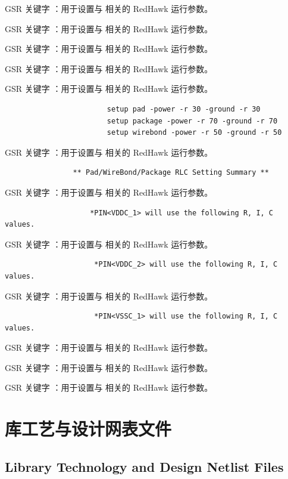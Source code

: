 GSR 关键字 ：用于设置与  相关的 RedHawk 运行参数。

GSR 关键字 ：用于设置与  相关的 RedHawk 运行参数。

GSR 关键字 ：用于设置与  相关的 RedHawk 运行参数。

GSR 关键字 ：用于设置与  相关的 RedHawk 运行参数。

GSR 关键字 ：用于设置与  相关的 RedHawk 运行参数。

\begin{lstlisting}
                        setup pad -power -r 30 -ground -r 30
                        setup package -power -r 70 -ground -r 70
                        setup wirebond -power -r 50 -ground -r 50
\end{lstlisting}

GSR 关键字 ：用于设置与  相关的 RedHawk 运行参数。

\begin{lstlisting}
                ** Pad/WireBond/Package RLC Setting Summary **
\end{lstlisting}

GSR 关键字 ：用于设置与  相关的 RedHawk 运行参数。

\begin{lstlisting}
                    *PIN<VDDC_1> will use the following R, I, C values.
\end{lstlisting}

GSR 关键字 ：用于设置与  相关的 RedHawk 运行参数。

\begin{lstlisting}
                     *PIN<VDDC_2> will use the following R, I, C values.
\end{lstlisting}

GSR 关键字 ：用于设置与  相关的 RedHawk 运行参数。

\begin{lstlisting}
                     *PIN<VSSC_1> will use the following R, I, C values.
\end{lstlisting}

GSR 关键字 ：用于设置与  相关的 RedHawk 运行参数。

GSR 关键字 ：用于设置与  相关的 RedHawk 运行参数。

GSR 关键字 ：用于设置与  相关的 RedHawk 运行参数。

\section{库工艺与设计网表文件}
\subsection*{Library Technology and Design Netlist Files}

